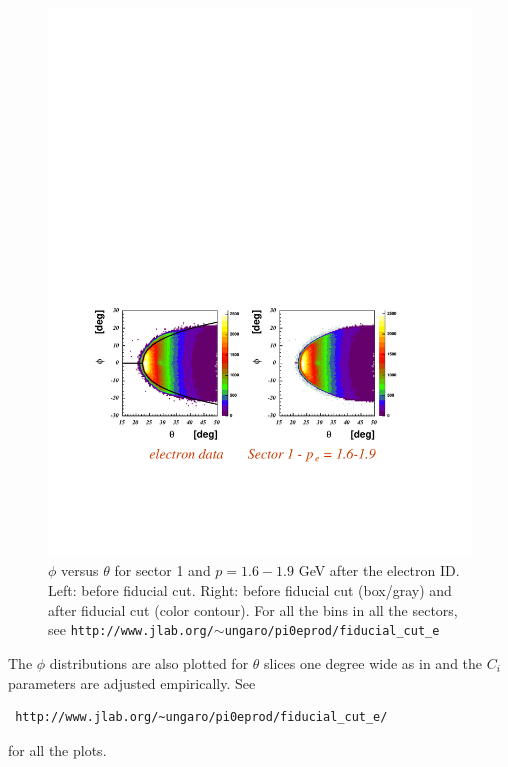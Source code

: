 \begin{figure}[h]
 \begin{center}
 \includegraphics[width = 14cm, bb=0 130 550 400]{data_reduction/img/electron_tph} 
  \caption[$\phi$ versus $\theta$ for sector 1 and $p=1.6-1.9$ GeV]
          { $\phi$ versus $\theta$ for sector 1 and $p=1.6-1.9$ GeV after the electron ID. Left:
                     before fiducial cut. Right: before fiducial cut (box/gray) and after fiducial cut (color contour). 
                     For all the
                     bins in all the sectors, see
                     {\tt  http://www.jlab.org/$\sim$ungaro/pi0eprod/fiducial\_cut\_e}
          }
 \label{fig:fidu_etph}
 \end{center}
\end{figure}
The $\phi$ distributions are also plotted for $\theta$ slices one degree wide as in 
and the $C_i$ parameters are adjusted empirically.
See    \begin{verbatim} http://www.jlab.org/~ungaro/pi0eprod/fiducial_cut_e/ \end{verbatim}
for all the plots.

